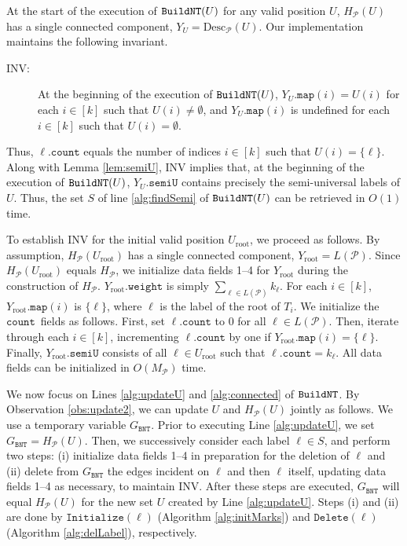 \documentclass[11pt]{article}
\newcommand{\MP}{\ensuremath{M_\P}} \newcommand{\TG}{\ensuremath{\Gamma}} \newcommand{\incompatible}{\texttt{incompatible}}
\newcommand{\Uinit}{\ensuremath{U_\mathrm{root}}} \newcommand{\Ubef}{\ensuremath{U_\mathrm{bef}}} \newcommand{\Uaft}{\ensuremath{U_\mathrm{aft}}} \newcommand{\Urem}{\ensuremath{U_\mathrm{rem}}} \newcommand{\Yinit}{\ensuremath{Y_\mathrm{root}}} \newcommand{\Winit}{\ensuremath{W_\mathrm{root}}} \newcommand{\indeg}{\ensuremath{\mathrm{indegree}}} \newcommand{\Desc}{\ensuremath{\mathrm{Desc}}}
\newcommand{\DG}{\ensuremath{H_\P}} \newcommand{\GBNT}{\ensuremath{G_{\mathtt{BNT}}}}
\newcommand{\InitLists}{\ensuremath{\texttt{Initialize}}}
\newcommand{\DelLabel}{\ensuremath{\texttt{Delete}}}
\renewcommand{\P}{\ensuremath{\mathcal{P}}}
\newcommand{\cnt}{\ensuremath{\mathtt{count}}} \newcommand{\ID}{\ensuremath{\mathtt{id}}} \newcommand{\TYPE}{\ensuremath{\mathtt{in}}} \newcommand{\SIZE}{\ensuremath{\mathtt{size}}} \newcommand{\COUNT}{\ensuremath{\mathtt{count}}} \newcommand{\SET}{\ensuremath{\mathtt{set}}} \newcommand{\SEMI}{\ensuremath{\mathtt{semiU}}} \newcommand{\LABEL}{\ensuremath{\mathtt{label}}} \newcommand{\WEIGHT}{\ensuremath{\mathtt{weight}}} \newcommand{\NULL}{\ensuremath{\mathtt{null}}} \newcommand{\MAP}{\ensuremath{\mathtt{map}}} \newcommand{\KEY}{\ensuremath{\mathtt{key}}} \newcommand{\VALUE}{\ensuremath{\mathtt{value}}} \newcommand{\KEYSET}{\ensuremath{\mathtt{keySet}}}
\theoremstyle{definition}
\begin{document}
At the start of the execution of $\texttt{BuildNT}(U)$ for any valid position $U$, $\DG(U)$ has a single connected component, $Y_U = \Desc_\P(U)$.  Our implementation maintains the following invariant. 
\begin{description}\item[INV:]
At the beginning of the execution of $\texttt{BuildNT}(U)$, $Y_U.\MAP(i) = U(i)$ for each $i \in [k]$ such that $U(i) \neq \emptyset$, and $Y_U.\MAP(i)$ is undefined for each $i \in [k]$ such that $U(i) = \emptyset$.
\end{description}
Thus, $\ell.\cnt$ equals the number of indices $i \in [k]$ such that $U(i) = \{\ell\}$.  Along with Lemma \ref{lem:semiU}, INV implies that, at the beginning of the execution of $\texttt{BuildNT}(U)$, $Y_U.\SEMI$ contains precisely the semi-universal labels of $U$.
Thus, the set $S$ of line \ref{alg:findSemi} of $\texttt{BuildNT}(U)$ can be retrieved in $O(1)$ time.

To establish INV for the initial valid position $\Uinit$, we proceed as follows.  By assumption, $\DG(\Uinit)$ has a single connected component, $\Yinit =  L(\P)$.  
Since $\DG(\Uinit)$ equals $\DG$, we initialize data fields 1--4 for $\Yinit$ during the construction of $\DG$. 
$\Yinit.\WEIGHT$ is simply $\sum_{\ell \in L(\P)} k_\ell$. For each $i \in [k]$, $\Yinit.\MAP(i)$ is $\{\ell\}$, where $\ell$ is the label of the root of $T_i$.  We initialize the \cnt\ fields as follows.  
First, set $\ell.\cnt$ to $0$ for all $\ell \in L(\P)$.  Then,  iterate through each $i \in [k]$, incrementing $\ell.\cnt$ by one if $\Yinit.\MAP(i) = \{\ell\}$.  Finally, $\Yinit.\SEMI$ consists of all $\ell \in \Uinit$ such that $\ell.\cnt = k_\ell$.  All data fields can be initialized in $O(\MP)$ time.


We now focus on Lines \ref{alg:updateU} and \ref{alg:connected} of $\texttt{BuildNT}$. By Observation \ref{obs:update2}, we can update $U$ and $\DG(U)$ jointly as follows. We use a temporary variable $\GBNT$.  Prior to executing Line \ref{alg:updateU}, we set $\GBNT = \DG(U)$.
Then, we successively consider each label $\ell \in S$, and perform two steps: (i) initialize data fields 1--4 in preparation for the deletion of $\ell$ and (ii) delete from $\GBNT$ the edges incident on $\ell$ and then $\ell$ itself, updating data fields 1--4 as necessary, to maintain INV.  After these steps are executed, $\GBNT$ will equal $\DG(U)$ for the new set $U$ created by Line \ref{alg:updateU}.  Steps (i) and (ii) are done by $\InitLists(\ell)$ (Algorithm \ref{alg:initMarks}) and $\DelLabel(\ell)$ (Algorithm \ref{alg:delLabel}), respectively. 
\end{document}
